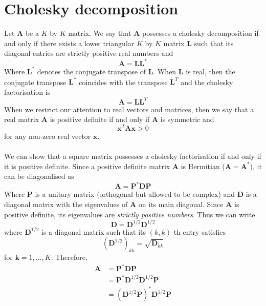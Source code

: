 \documentclass{report}
\begin{document}
\section{Cholesky decomposition}
Let $\bm A$ be a $K$ by $K$ matrix. We say that $\bm A$ possesses a cholesky decomposition if and only if there exists a lower triangular 
$K$ by $K$ matrix $\bm L$ such that its diagonal entries are strictly positive real numbers and 
\begin{equation*}
\bm A=\bm{LL}^*
\end{equation*}
Where $\bm L^*$ denotes the conjugate transpose of $\bm L$. When $\bm L$ is real, then the conjugate transpose $\bm L^*$ coincides with the 
transpose $\bm L^T$ and the cholesky factorisation is
\begin{equation*}
\bm A=\bm{LL}^T
\end{equation*}
When we restrict our attention to real vectors and matrices, then we say that a real matrix $\bm A$ is positive definite if and only if $\bm A$ 
is symmetric and 
\begin{equation*}
\bm x^T\bm{Ax}>0
\end{equation*}
for any non-zero real vector $\bm x$.\\
\vspace{1mm}\\
We can show that a square matrix possesses a cholesky factorisation if and only if it is positive definite. Since a positive definite matrix $\bm A$
is Hermitian ($\bm A=\bm A^*$), it can be diagonalised as
\begin{equation*}
\bm A=\bm P^*\bm{DP}
\end{equation*}
Where $\bm P$ is a unitary matrix (orthogonal but allowed to be complex) and $\bm D$ is a diagonal matrix with the eigenvalues of $\bm A$ on its 
main diagonal. Since $\bm A$ is positive definite, its eigenvalues are 
\textit{strictly positive numbers}. Thus we can write
\begin{equation*}
\bm D=\bm D^{1/2}\bm D^{1/2}
\end{equation*}
where $\bm D^{1/2}$ is a diagonal matrix such that its $(k,k)$-th entry satisfies
\begin{equation*}
(\bm D^{1/2})_{kk}=\sqrt{\bm D_{kk}}
\end{equation*}
for $\bm k=1,\ldots,K$. Therefore,
\begin{align*}
\bm A&=\bm P^*\bm{DP}\\
&=\bm P^*\bm D^{1/2}\bm D^{1/2}\bm P\\
&=(\bm D^{1/2}\bm P)^*\bm D^{1/2}\bm P
\end{align*}
\end{document}
